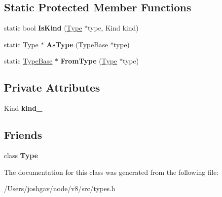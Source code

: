 \subsection*{Static Protected Member Functions}
\begin{DoxyCompactItemize}
\item 
static bool {\bfseries Is\+Kind} (\hyperlink{classv8_1_1internal_1_1_type}{Type} $\ast$type, Kind kind)\hypertarget{classv8_1_1internal_1_1_type_base_a166710bdd4a4ec92d5268573405edf32}{}\label{classv8_1_1internal_1_1_type_base_a166710bdd4a4ec92d5268573405edf32}

\item 
static \hyperlink{classv8_1_1internal_1_1_type}{Type} $\ast$ {\bfseries As\+Type} (\hyperlink{classv8_1_1internal_1_1_type_base}{Type\+Base} $\ast$type)\hypertarget{classv8_1_1internal_1_1_type_base_a95f5b21ab403d4582ba3d2d36ef68195}{}\label{classv8_1_1internal_1_1_type_base_a95f5b21ab403d4582ba3d2d36ef68195}

\item 
static \hyperlink{classv8_1_1internal_1_1_type_base}{Type\+Base} $\ast$ {\bfseries From\+Type} (\hyperlink{classv8_1_1internal_1_1_type}{Type} $\ast$type)\hypertarget{classv8_1_1internal_1_1_type_base_afa519214d324a6f7eeffa1d36c03e169}{}\label{classv8_1_1internal_1_1_type_base_afa519214d324a6f7eeffa1d36c03e169}

\end{DoxyCompactItemize}
\subsection*{Private Attributes}
\begin{DoxyCompactItemize}
\item 
Kind {\bfseries kind\+\_\+}\hypertarget{classv8_1_1internal_1_1_type_base_a1869e83fd3d43925bd0a4faa5c06bca0}{}\label{classv8_1_1internal_1_1_type_base_a1869e83fd3d43925bd0a4faa5c06bca0}

\end{DoxyCompactItemize}
\subsection*{Friends}
\begin{DoxyCompactItemize}
\item 
class {\bfseries Type}\hypertarget{classv8_1_1internal_1_1_type_base_a18dba29b4f3e91d6d2bc53472a6bb7cc}{}\label{classv8_1_1internal_1_1_type_base_a18dba29b4f3e91d6d2bc53472a6bb7cc}

\end{DoxyCompactItemize}


The documentation for this class was generated from the following file\+:\begin{DoxyCompactItemize}
\item 
/\+Users/joshgav/node/v8/src/types.\+h\end{DoxyCompactItemize}
